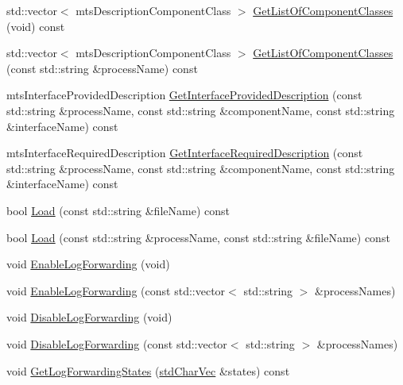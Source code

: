 \begin{DoxyCompactItemize}
\item 
std\+::vector$<$ mts\+Description\+Component\+Class $>$ \hyperlink{classmts_manager_component_services_a1ec4b1157dfab6f371d7247a1c736dc5}{Get\+List\+Of\+Component\+Classes} (void) const 
\item 
std\+::vector$<$ mts\+Description\+Component\+Class $>$ \hyperlink{classmts_manager_component_services_a50b91497aea42ceed34ce0366b33544b}{Get\+List\+Of\+Component\+Classes} (const std\+::string \&process\+Name) const 
\item 
mts\+Interface\+Provided\+Description \hyperlink{classmts_manager_component_services_af3e386364e4724619500f756aee841d3}{Get\+Interface\+Provided\+Description} (const std\+::string \&process\+Name, const std\+::string \&component\+Name, const std\+::string \&interface\+Name) const 
\item 
mts\+Interface\+Required\+Description \hyperlink{classmts_manager_component_services_a2a886ede498b63f0b9e7feebc61515a3}{Get\+Interface\+Required\+Description} (const std\+::string \&process\+Name, const std\+::string \&component\+Name, const std\+::string \&interface\+Name) const 
\item 
bool \hyperlink{classmts_manager_component_services_a3bd5a6fb204dc6634492a017826ac4d6}{Load} (const std\+::string \&file\+Name) const 
\item 
bool \hyperlink{classmts_manager_component_services_a810f37fd41bfa13aed6d529fc796c7ac}{Load} (const std\+::string \&process\+Name, const std\+::string \&file\+Name) const 
\item 
void \hyperlink{classmts_manager_component_services_a87f252282b2fca758264f3969fbc387a}{Enable\+Log\+Forwarding} (void)
\item 
void \hyperlink{classmts_manager_component_services_a53e074ce13e3a76f307307760b24d204}{Enable\+Log\+Forwarding} (const std\+::vector$<$ std\+::string $>$ \&process\+Names)
\item 
void \hyperlink{classmts_manager_component_services_aab3395d819330f83b23e7d92b3e5c3ed}{Disable\+Log\+Forwarding} (void)
\item 
void \hyperlink{classmts_manager_component_services_a4e336336253d0317957cbdc528788f85}{Disable\+Log\+Forwarding} (const std\+::vector$<$ std\+::string $>$ \&process\+Names)
\item 
void \hyperlink{classmts_manager_component_services_a6005565054c1a672521068c042b41e46}{Get\+Log\+Forwarding\+States} (\hyperlink{mts_generic_object_proxy_8h_a3fcb43cabc338a5aee6772138bee2416}{std\+Char\+Vec} \&states) const 

\end{DoxyCompactItemize}
